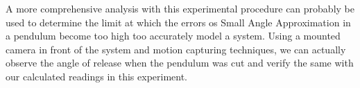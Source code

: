 A more comprehensive analysis with this experimental procedure can probably be used to determine the limit at which the errors os Small Angle Approximation in a pendulum become too high too accurately model a system. Using a mounted camera in front of the system and motion capturing techniques, we can actually observe the angle of release when the pendulum was cut and verify the same with our calculated readings in this experiment.